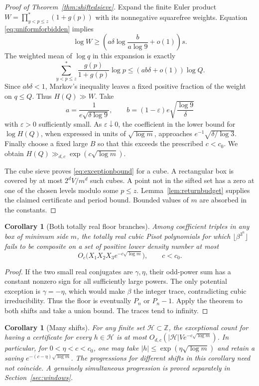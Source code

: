 \documentclass[11pt,a4paper]{article}
\newtheorem{corollary}[theorem]{Corollary}
\theoremstyle{remark}\newtheorem{remark}[theorem]{Remark}
\newcommand{\Z}{\mathbb Z}\newcommand{\Q}{\mathbb Q}
\begin{document}
\begin{proof}[Proof of Theorem~\ref{thm:shiftedsieve}]
Expand the finite Euler product $W=\prod_{y<p\le z}^{*}(1+g(p))$
with its nonnegative squarefree weights. Equation
\eqref{eq:uniformforbidden} implies
\[
 \log W\ge
 \left(a\delta\log\frac b{a\log9}+o(1)\right)s.
\]
The weighted mean of $\log q$ in this expansion is exactly
\[
 \sum_{y<p\le z}^{*}\frac{g(p)}{1+g(p)}\log p
 \le (ab\delta+o(1))\log Q.
\]
Since $ab\delta<1$, Markov's inequality leaves a fixed positive
fraction of the weight on $q\le Q$. Thus $H(Q)\gg W$.
Take
\[
 a=\frac1{e\sqrt{\delta\log9}},\qquad
 b=(1-\varepsilon)e\sqrt{\frac{\log9}{\delta}}
\]
with $\varepsilon>0$ sufficiently small. As $\varepsilon\downarrow0$,
the coefficient in the lower bound for $\log H(Q)$, when expressed
in units of $\sqrt{\log m}$, approaches
$e^{-1}\sqrt{\delta/\log3}$. Finally choose a fixed large $B$ so
that this exceeds the prescribed $c<c_0$. We obtain
$H(Q)\gg_{d,c}\exp(c\sqrt{\log m})$.

The cube sieve proves \eqref{eq:exceptionbound} for a cube. A
rectangular box is covered by at most $2^dV/m^d$ such cubes. A point
not in the sifted set has a zero at one of the chosen levels modulo
some $p\le z$. Lemma~\ref{lem:returnbudget} supplies the claimed
certificate and period bound. Bounded values of $m$ are absorbed
in the constants.
\end{proof}

\begin{corollary}[Both totally real floor branches]\label{cor:floorbox}
Among coefficient triples in any box of minimum side $m$, the
totally real cubic Pisot polynomials for which
$\lfloor\beta^{3^n}\rfloor$ fails to be composite on a set of
positive lower density number at most
\[
 O_c\bigl(X_1X_2X_3e^{-c\sqrt{\log m}}\bigr),\qquad c<c_0.
\]
\end{corollary}
\begin{proof}
If the two small real conjugates are $\gamma,\eta$, their odd-power
sum has a constant nonzero sign for all sufficiently large powers.
The only potential exception is $\gamma=-\eta$, which would make
$\beta$ the integer trace, contradicting cubic irreducibility.
Thus the floor is eventually $P_n$ or $P_n-1$. Apply the theorem
to both shifts and take a union bound. The traces tend to infinity.
\end{proof}

\begin{corollary}[Many shifts]\label{cor:manyshifts}
For any finite set $\mathcal H\subset\Z$, the exceptional count for
having a certificate for every $h\in\mathcal H$ is at most
$O_{d,c}(|\mathcal H|V e^{-c\sqrt{\log m}})$.
In particular, for $0<\eta<c<c_0$, one may take
$|h|\le\exp(\eta\sqrt{\log m})$ and retain a saving
$e^{-(c-\eta)\sqrt{\log m}}$.
The progressions for different shifts in this corollary need not
coincide. A genuinely simultaneous progression is proved separately
in Section~\ref{sec:windows}.
\end{corollary}
\end{document}
